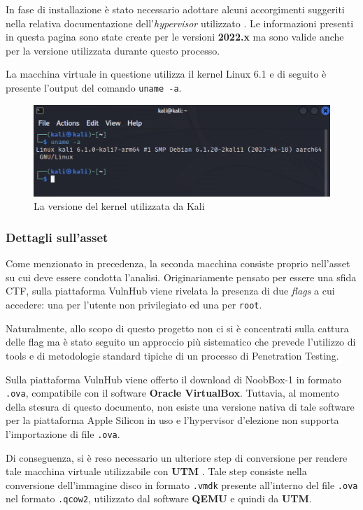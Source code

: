 \documentclass[a4paper, 12pt, oneside]{article}
\begin{document}
In fase di installazione è stato necessario adottare alcuni accorgimenti suggeriti nella relativa documentazione dell'\textit{hypervisor} utilizzato \cite{kali-utm}. Le informazioni presenti in questa pagina sono state create per le versioni \textbf{2022.x} ma sono valide anche per la versione utilizzata durante questo processo.

La macchina virtuale in questione utilizza il kernel Linux 6.1 e di seguito è presente l'output del comando \verb|uname -a|.

\begin{figure}[h]
    \centering
    \includegraphics[width=\textwidth]{img/uname.png}
    \caption{La versione del kernel utilizzata da Kali}
\end{figure}

\subsubsection{Dettagli sull'asset}
Come menzionato in precedenza, la seconda macchina consiste proprio nell'asset su cui deve essere condotta l'analisi. Originariamente pensato per essere una sfida CTF, sulla piattaforma VulnHub viene rivelata la presenza di due \textit{flags} a cui accedere: una per l'utente non privilegiato ed una per \texttt{root}. 

Naturalmente, allo scopo di questo progetto non ci si è concentrati sulla cattura delle flag ma è stato seguito un approccio più sistematico che prevede l'utilizzo di tools e di metodologie standard tipiche di un processo di Penetration Testing.

Sulla piattaforma VulnHub viene offerto il download di NoobBox-1 in formato \texttt{.ova}, compatibile con il software \textbf{Oracle VirtualBox}. Tuttavia, al momento della stesura di questo documento, non esiste una versione nativa di tale software per la piattaforma Apple Silicon in uso e l'hypervisor d'elezione non supporta l'importazione di file \texttt{.ova}. 

Di conseguenza, si è reso necessario un ulteriore step di conversione per rendere tale macchina virtuale utilizzabile con \textbf{UTM} \cite{qcow}. Tale step consiste nella conversione dell'immagine disco in formato \texttt{.vmdk} presente all'interno del file \texttt{.ova} nel formato \texttt{.qcow2}, utilizzato dal software \textbf{QEMU} e quindi da \textbf{UTM}.
\end{document}
